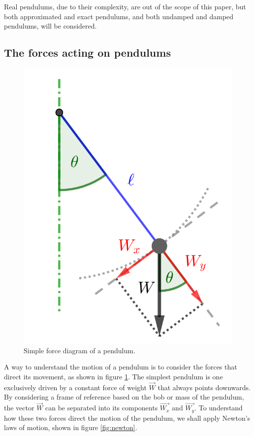 \documentclass[12pt, a4paper, titlepage]{article}
\theoremstyle{definition}
\numberwithin{equation}{section}
\theoremstyle{definition}
\theoremstyle{definition}
\begin{document}
Real pendulums, due to their complexity, are out of the scope of this paper, but both approximated and exact pendulums, and both undamped and damped pendulums, will be considered.

\subsection{The forces acting on pendulums}
\begin{figure}[H]
    \centering
    \includegraphics[scale=0.8]{force.png}
    \caption{Simple force diagram of a pendulum.}
    \label{fig:force}
\end{figure}
A way to understand the motion of a pendulum is to consider the forces that direct its movement, as shown in figure \ref{fig:force}. The simplest pendulum is one exclusively driven by a constant force of weight $\vec{W}$ that always points downwards. By considering a frame of reference based on the bob or mass of the pendulum, the vector $\vec{W}$ can be separated into its components $\vec{W_x}$ and $\vec{W_y}$. To understand how these two forces direct the motion of the pendulum, we shall apply Newton's laws of motion, shown in figure \ref{fig:newton}.
\end{document}
